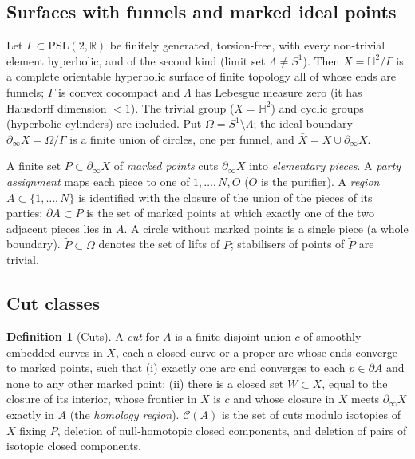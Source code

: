 \documentclass[aps,prd,onecolumn,superscriptaddress,nofootinbib,amsmath,amssymb,11pt]{revtex4-2}
\theoremstyle{definition}
\newtheorem{definition}[theorem]{Definition}
\newcommand{\Hyp}{\mathbb{H}^2}
\newcommand{\R}{\mathbb{R}}
\newcommand{\PSL}{\mathrm{PSL}(2,\R)}
\newcommand{\Cut}{\mathcal{C}}
\newcommand{\Pt}{\tilde P}
\begin{document}
\subsection{Surfaces with funnels and marked ideal points}

Let $\Gamma\subset\PSL$ be finitely generated, torsion-free, with every non-trivial element hyperbolic, and of
the second kind (limit set $\Lambda\ne S^1$). Then $X=\Hyp/\Gamma$ is a complete orientable hyperbolic surface
of finite topology all of whose ends are funnels; $\Gamma$ is convex cocompact and $\Lambda$ has Lebesgue
measure zero (it has Hausdorff dimension $<1$). The trivial group ($X=\Hyp$) and cyclic groups (hyperbolic
cylinders) are included. Put $\Omega=S^1\setminus\Lambda$; the ideal boundary $\partial_\infty X=\Omega/\Gamma$ is
a finite union of circles, one per funnel, and $\bar X=X\cup\partial_\infty X$.

A finite set $P\subset\partial_\infty X$ of \emph{marked points} cuts $\partial_\infty X$ into
\emph{elementary pieces}. A \emph{party assignment} maps each piece to one of $1,\dots,N,O$ ($O$ is the
purifier). A \emph{region} $A\subset\{1,\dots,N\}$ is identified with the closure of the union of the pieces
of its parties; $\partial A\subset P$ is the set of marked points at which exactly one of the two adjacent
pieces lies in $A$. A circle without marked points is a single piece (a whole boundary). $\Pt\subset\Omega$
denotes the set of lifts of $P$; stabilisers of points of $\Pt$ are trivial.

\subsection{Cut classes}

\begin{definition}[Cuts]\label{def:cut}
A \emph{cut} for $A$ is a finite disjoint union $c$ of smoothly embedded curves in $X$, each a closed curve
or a proper arc whose ends converge to marked points, such that (i) exactly one arc end converges to each
$p\in\partial A$ and none to any other marked point; (ii) there is a closed set $W\subset X$, equal to the
closure of its interior, whose frontier in $X$ is $c$ and whose closure in $\bar X$ meets $\partial_\infty X$
exactly in $A$ (the \emph{homology region}). $\Cut(A)$ is the set of cuts modulo isotopies of $\bar X$ fixing
$P$, deletion of null-homotopic closed components, and deletion of pairs of isotopic closed components.
\end{definition}
\end{document}
